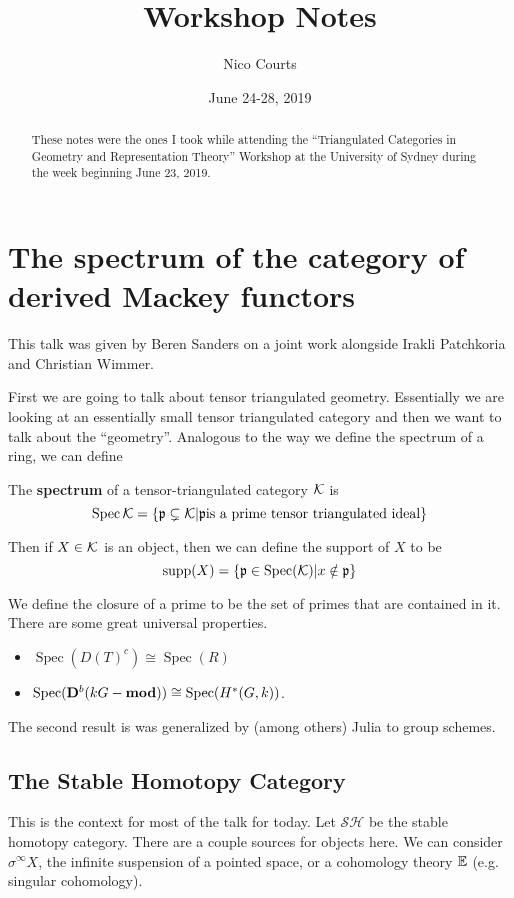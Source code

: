 \documentclass[12pt]{article}
\newcommand{\p}{\frakp}
\DeclareMathOperator{\Spec}{Spec}
\newcommand{\SH}{\mathcal{SH}}
\begin{document}
\title{Workshop Notes\vspace{-1ex}}
\author{Nico Courts}
\date{June 24-28, 2019}
\maketitle

\renewcommand{\abstractname}{Introduction}
\begin{abstract}
	These notes were the ones I took while attending the ``Triangulated Categories in Geometry and Representation Theory'' Workshop 
	at the University of Sydney during the week beginning June 23, 2019.
\end{abstract}

\section{The spectrum of the category of derived Mackey functors}
This talk was given by Beren Sanders on a joint work alongside Irakli Patchkoria and Christian Wimmer.

First we are going to talk about tensor triangulated geometry. Essentially we are looking at 
an essentially small tensor triangulated category and then we want to talk about the ``geometry''.
Analogous to the way we define the spectrum of a ring, we can define 
\begin{defn}
	The \textbf{spectrum} of a tensor-triangulated category $\mathcal{K}$ is 
	\[\operatorname{Spec}{\calK}=\{\p\subsetneq \calK|\p\text{is a prime tensor triangulated ideal}\}\]
\end{defn}

Then if $X\in\mathcal{K}$ is an object, then we can define the support of $X$ to be 
\[\operatorname{supp}(X)=\{\p\in\operatorname{Spec}(\calK)|x\notin\p\}\]

We define the closure of a prime to be the set of primes that are contained in it. There are some great universal properties.

\begin{lem}
	\begin{itemize}
		\item $\Spec(D(T)^c)\cong\Spec(R)$
		\item $\Spec(\Db(kG-\mathbf{mod}))\cong \Spec(H^\ast(G,k))$.
	\end{itemize}
	The second result is was generalized by (among others) Julia to group schemes.	
\end{lem}

\subsection{The Stable Homotopy Category}
This is the context for most of the talk for today. Let $\SH$ be the stable homotopy category.
There are a couple sources for objects here. We can consider $\sigma^\infty X$, the infinite suspension of a pointed space, 
or a cohomology theory $\mathbb{E}$ (e.g. singular cohomology).
\end{document}
